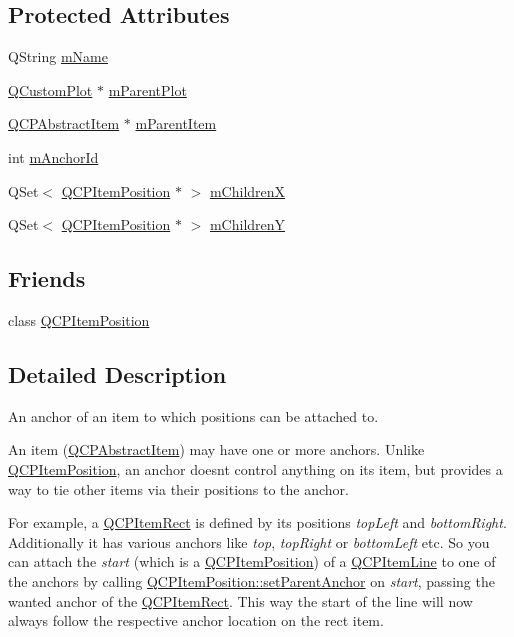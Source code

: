 \subsection*{Protected Attributes}
\begin{DoxyCompactItemize}
\item 
Q\+String \hyperlink{classQCPItemAnchor_a23ad4d0ab0d2cbb41a7baf05bcf996ec}{m\+Name}
\item 
\hyperlink{classQCustomPlot}{Q\+Custom\+Plot} $\ast$ \hyperlink{classQCPItemAnchor_a59b968410831ba91a25cc75a77dde6f5}{m\+Parent\+Plot}
\item 
\hyperlink{classQCPAbstractItem}{Q\+C\+P\+Abstract\+Item} $\ast$ \hyperlink{classQCPItemAnchor_a80fad480ad3bb980446ed6ebc00818ae}{m\+Parent\+Item}
\item 
int \hyperlink{classQCPItemAnchor_a00c62070333e8345976b579676ad3997}{m\+Anchor\+Id}
\item 
Q\+Set$<$ \hyperlink{classQCPItemPosition}{Q\+C\+P\+Item\+Position} $\ast$ $>$ \hyperlink{classQCPItemAnchor_a3c0bfd6e50f3b48e2a9b3824695b20f7}{m\+ChildrenX}
\item 
Q\+Set$<$ \hyperlink{classQCPItemPosition}{Q\+C\+P\+Item\+Position} $\ast$ $>$ \hyperlink{classQCPItemAnchor_a3abe4eebd0683454d81c8341df6f7115}{m\+ChildrenY}
\end{DoxyCompactItemize}
\subsection*{Friends}
\begin{DoxyCompactItemize}
\item 
class \hyperlink{classQCPItemAnchor_aa9b8ddc062778e202a0be06a57d18d17}{Q\+C\+P\+Item\+Position}
\end{DoxyCompactItemize}


\subsection{Detailed Description}
An anchor of an item to which positions can be attached to. 

An item (\hyperlink{classQCPAbstractItem}{Q\+C\+P\+Abstract\+Item}) may have one or more anchors. Unlike \hyperlink{classQCPItemPosition}{Q\+C\+P\+Item\+Position}, an anchor doesn\textquotesingle{}t control anything on its item, but provides a way to tie other items via their positions to the anchor.

For example, a \hyperlink{classQCPItemRect}{Q\+C\+P\+Item\+Rect} is defined by its positions {\itshape top\+Left} and {\itshape bottom\+Right}. Additionally it has various anchors like {\itshape top}, {\itshape top\+Right} or {\itshape bottom\+Left} etc. So you can attach the {\itshape start} (which is a \hyperlink{classQCPItemPosition}{Q\+C\+P\+Item\+Position}) of a \hyperlink{classQCPItemLine}{Q\+C\+P\+Item\+Line} to one of the anchors by calling \hyperlink{classQCPItemPosition_ac094d67a95d2dceafa0d50b9db3a7e51}{Q\+C\+P\+Item\+Position\+::set\+Parent\+Anchor} on {\itshape start}, passing the wanted anchor of the \hyperlink{classQCPItemRect}{Q\+C\+P\+Item\+Rect}. This way the start of the line will now always follow the respective anchor location on the rect item.

